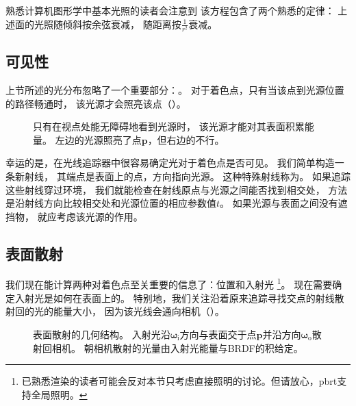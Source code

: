 熟悉计算机图形学中基本光照的读者会注意到
该方程包含了两个熟悉的定律：
上述面的光照随倾斜按余弦衰减，
随距离按$\displaystyle\frac{1}{r^2}$衰减。

\subsection{可见性}\label{sub:可见性}

上节所述的光分布忽略了一个重要部分：。
对于着色点，只有当该点到光源位置的路径畅通时，
该光源才会照亮该点（）。
\begin{figure}[htbp]
      \centering
      \caption{只有在视点处能无障碍地看到光源时，
            该光源才能对其表面积累能量。
            左边的光源照亮了点$\bm p$，但右边的不行。}\label{fig:1.5}
\end{figure}

幸运的是，在光线追踪器中很容易确定光对于着色点是否可见。
我们简单构造一条新射线，
其端点是表面上的点，方向指向光源。
这种特殊射线称为。
如果追踪这些射线穿过环境，
我们就能检查在射线原点与光源之间能否找到相交处，
方法是沿射线方向比较相交处和光源位置的相应参数值$t$。
如果光源与表面之间没有遮挡物，
就应考虑该光源的作用。

\subsection{表面散射}\label{sub:表面散射}
我们现在能计算两种对着色点至关重要的信息了：位置和入射光
\footnote{已熟悉渲染的读者可能会反对本节只考虑直接照明的讨论。但请放心，pbrt支持全局照明。}。
现在需要确定入射光是如何在表面上的。
特别地，我们关注沿着原来追踪寻找交点的射线散射回的光的能量大小，
因为该光线会通向相机（）。
\begin{figure}[htbp]
      \centering
      \caption{表面散射的几何结构。
            入射光沿${\bm \omega}_\mathrm{i}$方向与表面交于点$\bm p$并沿方向${\bm \omega}_\mathrm{o}$散射回相机。
            朝相机散射的光量由入射光能量与BRDF的积给定。}\label{fig:1.6}
\end{figure}

